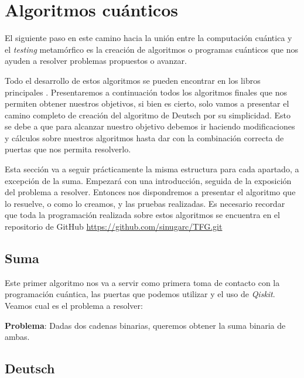\cleardoublepage

\chapter{Algoritmos cuánticos}
\label{Cap3:Algoritmos}

El siguiente paso en este camino hacia la unión entre la computación cuántica y el \textit{testing} metamórfico es la creación de algoritmos o programas cuánticos que nos ayuden a resolver problemas propuestos o avanzar. \newline

Todo el desarrollo de estos algoritmos se pueden encontrar en los libros principales \cite{B:Nielsen:2002}\cite{B:QuantumScientist:2008}. Presentaremos a continuación todos los algoritmos finales que nos permiten obtener nuestros objetivos, si bien es cierto, solo vamos a presentar el camino completo de creación del algoritmo de Deutsch por su simplicidad. Esto se debe a que para alcanzar nuestro objetivo debemos ir haciendo modificaciones y cálculos sobre nuestros algoritmos hasta dar con la combinación correcta de puertas que nos permita resolverlo.\newline

Esta sección va a seguir prácticamente la misma estructura para cada apartado, a excepción de la suma. Empezará con una introducción, seguida de la exposición del problema a resolver. Entonces nos dispondremos a presentar el algoritmo que lo resuelve, o como lo creamos, y las pruebas realizadas. Es necesario recordar que toda la programación realizada sobre estos algoritmos se encuentra en el repositorio de GitHub \url{https://github.com/sinugarc/TFG.git}

\section{Suma}
\label{Sec3.1:Suma}
 Este primer algoritmo nos va a servir como primera toma de contacto con la programación cuántica, las puertas que podemos utilizar y el uso de \textit{Qiskit}. Veamos cual es el problema a resolver:\newline

 \textbf{Problema}: Dadas dos cadenas binarias, queremos obtener la suma binaria de ambas.\newline

\section{Deutsch}
\label{Sec3.2:Deutsch}

